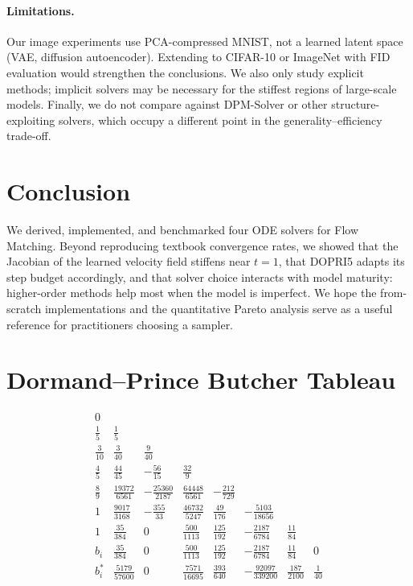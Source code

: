 \documentclass[11pt]{article}
\begin{document}
\paragraph{Limitations.}
Our image experiments use PCA-compressed MNIST, not a learned
latent space (VAE, diffusion autoencoder).  Extending to
CIFAR-10 or ImageNet with FID evaluation would strengthen the
conclusions.  We also only study explicit methods; implicit
solvers may be necessary for the stiffest regions of large-scale
models.  Finally, we do not compare against DPM-Solver or other
structure-exploiting solvers, which occupy a different point in
the generality--efficiency trade-off.

\section{Conclusion}
\label{sec:conclusion}

We derived, implemented, and benchmarked four ODE solvers for
Flow Matching.  Beyond reproducing textbook convergence rates,
we showed that the Jacobian of the learned velocity field
stiffens near $t{=}1$, that DOPRI5 adapts its step budget
accordingly, and that solver choice interacts with model maturity:
higher-order methods help most when the model is imperfect.
We hope the from-scratch implementations and the quantitative
Pareto analysis serve as a useful reference for practitioners
choosing a sampler.



\newpage
\appendix

\section{Dormand--Prince Butcher Tableau}
\label{app:dopri-tableau}

\begin{equation}
\begin{array}{c|ccccccc}
0 & & & & & & & \\
\frac{1}{5} & \frac{1}{5} \\
\frac{3}{10} & \frac{3}{40} & \frac{9}{40} \\
\frac{4}{5} & \frac{44}{45} & -\frac{56}{15} & \frac{32}{9} \\
\frac{8}{9} & \frac{19372}{6561} & -\frac{25360}{2187} & \frac{64448}{6561} & -\frac{212}{729} \\
1 & \frac{9017}{3168} & -\frac{355}{33} & \frac{46732}{5247} & \frac{49}{176} & -\frac{5103}{18656} \\
1 & \frac{35}{384} & 0 & \frac{500}{1113} & \frac{125}{192} & -\frac{2187}{6784} & \frac{11}{84} \\
\hline
b_i & \frac{35}{384} & 0 & \frac{500}{1113} & \frac{125}{192} & -\frac{2187}{6784} & \frac{11}{84} & 0 \\
b_i^* & \frac{5179}{57600} & 0 & \frac{7571}{16695} & \frac{393}{640} & -\frac{92097}{339200} & \frac{187}{2100} & \frac{1}{40}
\end{array}
\end{equation}
\end{document}
